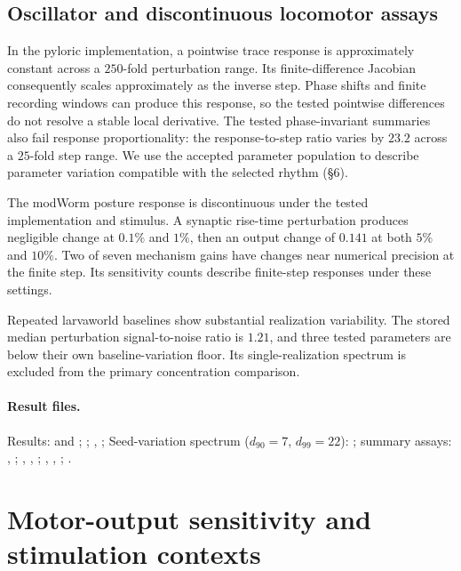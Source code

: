 \documentclass[11pt,letterpaper]{article}
\begin{document}
\subsection{Oscillator and discontinuous locomotor assays}
In the pyloric implementation, a pointwise trace response is approximately constant across a $250$-fold perturbation range. Its finite-difference Jacobian consequently scales approximately as the inverse step. Phase shifts and finite recording windows can produce this response, so the tested pointwise differences do not resolve a stable local derivative. The tested phase-invariant summaries also fail response proportionality: the response-to-step ratio varies by $23.2$ across a $25$-fold step range. We use the accepted parameter population to describe parameter variation compatible with the selected rhythm (\S6).

The modWorm posture response is discontinuous under the tested implementation and stimulus. A synaptic rise-time perturbation produces negligible change at $0.1\%$ and $1\%$, then an output change of $0.141$ at both $5\%$ and $10\%$. Two of seven mechanism gains have changes near numerical precision at the finite step. Its sensitivity counts describe finite-step responses under these settings.

Repeated larvaworld baselines show substantial realization variability. The stored median perturbation signal-to-noise ratio is $1.21$, and three tested parameters are below their own baseline-variation floor. Its single-realization spectrum is excluded from the primary concentration comparison.

\paragraph{Result files.}
Results:  and ; ; , ; Seed-variation spectrum ($d_{90}=7$, $d_{99}=22$): ; summary assays: , ; , , ; , , ; .

\section{Motor-output sensitivity and stimulation contexts}
\end{document}

